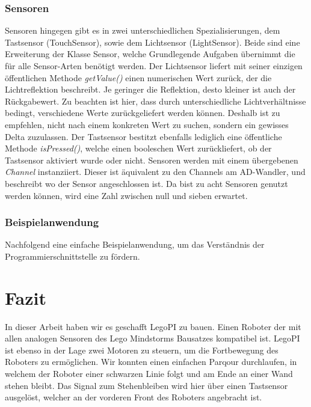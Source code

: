 \subsection{Sensoren}
Sensoren hingegen gibt es in zwei unterschiedlichen Spezialisierungen, dem Tastsensor (TouchSensor), sowie dem Lichtsensor (LightSensor). Beide sind eine Erweiterung der Klasse Sensor, welche Grundlegende Aufgaben übernimmt die für alle Sensor-Arten benötigt werden. Der Lichtsensor liefert mit seiner einzigen öffentlichen Methode \emph{getValue()} einen numerischen Wert zurück, der die Lichtreflektion beschreibt. Je geringer die Reflektion, desto kleiner ist auch der Rückgabewert. Zu beachten ist hier, dass durch unterschiedliche Lichtverhältnisse bedingt, verschiedene Werte zurückgeliefert werden können. Deshalb ist zu empfehlen, nicht nach einem konkreten Wert zu suchen, sondern ein gewisses Delta zuzulassen. Der Tastsensor bestitzt ebenfalls lediglich eine öffentliche Methode \emph{isPressed()}, welche einen booleschen Wert zurückliefert, ob der Tastsensor aktiviert wurde oder nicht. Sensoren werden mit einem übergebenen \emph{Channel} instanziiert. Dieser ist äquivalent zu den Channels am AD-Wandler, und beschreibt wo der Sensor angeschlossen ist. Da bist zu acht Sensoren genutzt werden können, wird eine Zahl zwischen null und sieben erwartet.

\subsection{Beispielanwendung}

Nachfolgend eine einfache Beispielanwendung, um das Verständnis der Programmierschnittstelle zu fördern.



\chapter{Fazit}

In dieser Arbeit haben wir es geschafft LegoPI zu bauen. Einen Roboter der mit allen analogen Sensoren des Lego Mindstorms Bausatzes kompatibel ist. LegoPI ist ebenso in der Lage zwei Motoren zu steuern, um die Fortbewegung des Roboters zu ermöglichen. Wir konnten einen einfachen Parqour durchlaufen, in welchem der Roboter einer schwarzen Linie folgt und am Ende an einer Wand stehen bleibt. Das Signal zum Stehenbleiben wird hier über einen Tastsensor ausgelöst, welcher an der vorderen Front des Roboters angebracht ist.
